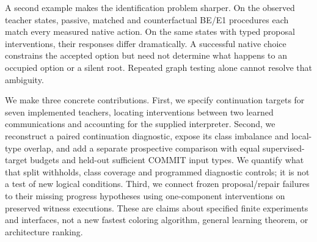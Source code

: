 \documentclass[10pt]{article}
\begin{document}
A second example makes the identification problem sharper. On the observed
teacher states, passive, matched and counterfactual BE/E1 procedures each
match every measured native action. On the same states with typed proposal
interventions, their responses differ dramatically. A successful native
choice constrains the accepted option but need not determine what happens
to an occupied option or a silent root. Repeated graph testing alone cannot
resolve that ambiguity.

We make three concrete contributions. First, we specify continuation targets
for seven implemented teachers, locating interventions between two learned
communications and accounting for the supplied interpreter. Second, we
reconstruct a paired continuation diagnostic, expose its class imbalance and
local-type overlap, and add a separate prospective comparison with equal
supervised-target budgets and held-out sufficient COMMIT input types. We
quantify what that split withholds, class coverage and programmed diagnostic
controls; it is not a test of new logical conditions. Third, we
connect frozen proposal/repair failures to their missing progress hypotheses
using one-component interventions on preserved witness executions. These
are claims about specified finite experiments and interfaces, not a new
fastest coloring algorithm, general learning theorem, or architecture ranking.
\end{document}
